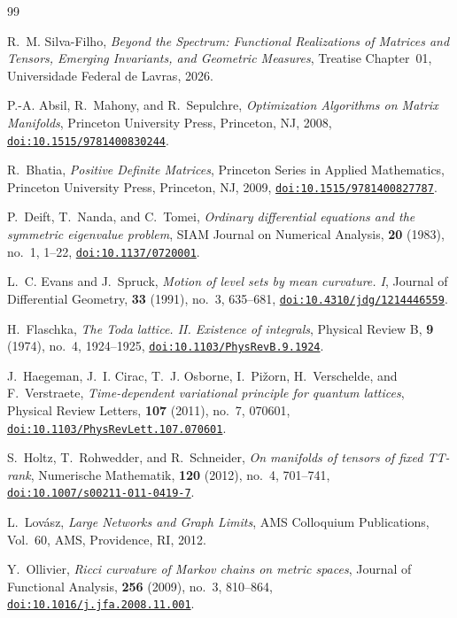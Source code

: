 \documentclass[11pt,a4paper,reqno]{amsart}
\theoremstyle{definition}
\numberwithin{equation}{section}
\providecommand{\doi}[1]{\href{https://doi.org/#1}{\texttt{doi:#1}}}
\begin{document}
\begin{thebibliography}{99}

R.~M. Silva-Filho,
\emph{Beyond the Spectrum: Functional Realizations of Matrices and Tensors, Emerging Invariants, and Geometric Measures},
Treatise Chapter~01, Universidade Federal de Lavras, 2026.

P.-A. Absil, R.~Mahony, and R.~Sepulchre,
\emph{Optimization Algorithms on Matrix Manifolds},
Princeton University Press, Princeton, NJ, 2008,
\doi{10.1515/9781400830244}.

R.~Bhatia,
\emph{Positive Definite Matrices},
Princeton Series in Applied Mathematics, Princeton University Press, Princeton, NJ, 2009,
\doi{10.1515/9781400827787}.

P.~Deift, T.~Nanda, and C.~Tomei,
\emph{Ordinary differential equations and the symmetric eigenvalue problem},
SIAM Journal on Numerical Analysis, \textbf{20} (1983), no.~1, 1--22,
\doi{10.1137/0720001}.

L.~C. Evans and J.~Spruck,
\emph{Motion of level sets by mean curvature. I},
Journal of Differential Geometry, \textbf{33} (1991), no.~3, 635--681,
\doi{10.4310/jdg/1214446559}.

H.~Flaschka,
\emph{The Toda lattice. II. Existence of integrals},
Physical Review B, \textbf{9} (1974), no.~4, 1924--1925,
\doi{10.1103/PhysRevB.9.1924}.

J.~Haegeman, J.~I. Cirac, T.~J. Osborne, I.~Pi{\v{z}}orn, H.~Verschelde, and F.~Verstraete,
\emph{Time-dependent variational principle for quantum lattices},
Physical Review Letters, \textbf{107} (2011), no.~7, 070601,
\doi{10.1103/PhysRevLett.107.070601}.

S.~Holtz, T.~Rohwedder, and R.~Schneider,
\emph{On manifolds of tensors of fixed TT-rank},
Numerische Mathematik, \textbf{120} (2012), no.~4, 701--741,
\doi{10.1007/s00211-011-0419-7}.

L.~Lov{\'a}sz,
\emph{Large Networks and Graph Limits},
AMS Colloquium Publications, Vol.~60, AMS, Providence, RI, 2012.

Y.~Ollivier,
\emph{Ricci curvature of Markov chains on metric spaces},
Journal of Functional Analysis, \textbf{256} (2009), no.~3, 810--864,
\doi{10.1016/j.jfa.2008.11.001}.


\end{thebibliography}
\end{document}
